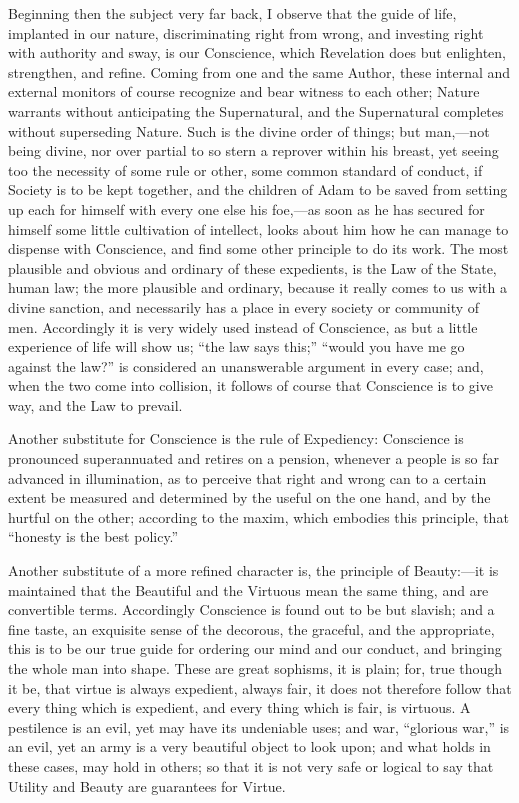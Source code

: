 Beginning then the subject very far back, I observe that the guide
of life, implanted in our nature, discriminating right from wrong, and
investing right with authority and sway, is our Conscience, which
Revelation does but enlighten, strengthen, and refine. Coming from one
and the same Author, these internal and external monitors of course
recognize and bear witness to each other; Nature warrants without
anticipating the Supernatural, and the Supernatural completes without
superseding Nature. Such is the divine order of things; but man,—not
being divine, nor over partial to so stern a reprover within his
breast, yet seeing too the necessity of some rule or other, some
common standard of conduct, if Society is to be kept together, and the
children of Adam to be saved from setting up each for himself with
every one else his foe,—as soon as he has secured for himself some
little cultivation of intellect, looks about him how he can manage to
dispense with Conscience, and find some other principle to do its
work. The most plausible and obvious and ordinary of these expedients,
is the Law of the State, human law; the more plausible and ordinary,
because it really comes to us with a divine sanction, and necessarily
has a place in every society or community of men. Accordingly it is
very widely used instead of Conscience, as but a little experience of
life will show us; ``the law says this;'' ``would you have
me go against the law?'' is considered an unanswerable argument in
every case; and, when the two come into collision, it follows of
course that Conscience is to give way, and the Law to prevail.

Another substitute for Conscience is the rule of Expediency:
Conscience is pronounced superannuated and retires on a pension,
whenever a people is so far advanced in illumination, as to perceive
that right and wrong can to a certain extent be measured and
determined by the useful on the one hand, and by the hurtful on
the other; according to the maxim, which embodies this principle, that
``honesty is the best policy.''

Another substitute of a more refined character is, the principle of
Beauty:—it is maintained that the Beautiful and the Virtuous mean
the same thing, and are convertible terms. Accordingly Conscience is
found out to be but slavish; and a fine taste, an exquisite sense of
the decorous, the graceful, and the appropriate, this is to be our
true guide for ordering our mind and our conduct, and bringing the
whole man into shape. These are great sophisms, it is plain; for, true
though it be, that virtue is always expedient, always fair, it does
not therefore follow that every thing which is expedient, and every
thing which is fair, is virtuous. A pestilence is an evil, yet may
have its undeniable uses; and war, ``glorious war,'' is an
evil, yet an army is a very beautiful object to look upon; and what
holds in these cases, may hold in others; so that it is not very safe
or logical to say that Utility and Beauty are guarantees for Virtue.

